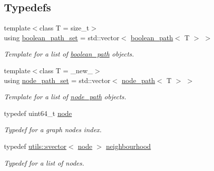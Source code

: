\subsection*{Typedefs}
\begin{DoxyCompactItemize}
\item 
\mbox{\label{namespacelgraph_afad432931ba600ab1628d5c9595986c5}} 
{\footnotesize template$<$class T  = size\+\_\+t$>$ }\\using \hyperlink{namespacelgraph_afad432931ba600ab1628d5c9595986c5}{boolean\+\_\+path\+\_\+set} = std\+::vector$<$ \hyperlink{classlgraph_1_1boolean__path}{boolean\+\_\+path}$<$ T $>$ $>$
\begin{DoxyCompactList}\small\item\em Template for a list of \hyperlink{classlgraph_1_1boolean__path}{boolean\+\_\+path} objects. \end{DoxyCompactList}\item 
\mbox{\label{namespacelgraph_a0570ce57129123d5816913d287f6cc73}} 
{\footnotesize template$<$class T  = \+\_\+new\+\_\+$>$ }\\using \hyperlink{namespacelgraph_a0570ce57129123d5816913d287f6cc73}{node\+\_\+path\+\_\+set} = std\+::vector$<$ \hyperlink{classlgraph_1_1node__path}{node\+\_\+path}$<$ T $>$ $>$
\begin{DoxyCompactList}\small\item\em Template for a list of \hyperlink{classlgraph_1_1node__path}{node\+\_\+path} objects. \end{DoxyCompactList}\item 
\mbox{\label{namespacelgraph_a397169dd66adf725210a30fb7251773e}} 
typedef uint64\+\_\+t \hyperlink{namespacelgraph_a397169dd66adf725210a30fb7251773e}{node}
\begin{DoxyCompactList}\small\item\em Typedef for a graph node\textquotesingle{}s index. \end{DoxyCompactList}\item 
\mbox{\label{namespacelgraph_a052e7766c13f3a43cec0aec8173fdede}} 
typedef \hyperlink{classlgraph_1_1utils_1_1svector}{utils\+::svector}$<$ \hyperlink{namespacelgraph_a397169dd66adf725210a30fb7251773e}{node} $>$ \hyperlink{namespacelgraph_a052e7766c13f3a43cec0aec8173fdede}{neighbourhood}
\begin{DoxyCompactList}\small\item\em Typedef for a list of nodes. \end{DoxyCompactList}\item 

\end{DoxyCompactItemize}
